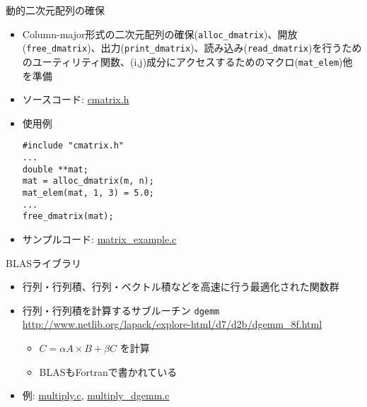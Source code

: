 \begin{frame}[t,fragile]{動的二次元配列の確保}
  \begin{itemize}
  \item Column-major形式の二次元配列の確保({\tt alloc\_dmatrix})、開放({\tt free\_dmatrix})、出力({\tt print\_dmatrix})、読み込み({\tt read\_dmatrix})を行うためのユーティリティ関数、(i,j)成分にアクセスするためのマクロ({\tt mat\_elem})他を準備
  \item ソースコード: \href{https://github.com/todo-group/computer-experiments/blob/master/exercise/matrix/cmatrix.h}{cmatrix.h}
  \item 使用例
\begin{lstlisting}
#include "cmatrix.h"
...
double **mat;
mat = alloc_dmatrix(m, n);
mat_elem(mat, 1, 3) = 5.0;
...
free_dmatrix(mat);
\end{lstlisting}
  \item サンプルコード: \href{https://github.com/todo-group/computer-experiments/blob/master/exercise/matrix/matrix_example.c}{matrix\_example.c}
  \end{itemize}
\end{frame}

\begin{frame}[t,fragile]{BLASライブラリ}
  \begin{itemize}
    \setlength{\itemsep}{1em}
  \item 行列・行列積、行列・ベクトル積などを高速に行う最適化された関数群
  \item 行列・行列積を計算するサブルーチン {\tt dgemm} \\
    \url{http://www.netlib.org/lapack/explore-html/d7/d2b/dgemm_8f.html}
    \begin{itemize}
    \item $C = \alpha A \times B + \beta C$ を計算
    \item BLASもFortranで書かれている
    \end{itemize}
  \item 例: \href{https://github.com/todo-group/computer-experiments/blob/master/exercise/matrix/multiply.c}{multiply.c}, \href{https://github.com/todo-group/computer-experiments/blob/master/exercise/matrix/multiply_dgemm.c}{multiply\_dgemm.c}
  \end{itemize}
\end{frame}

